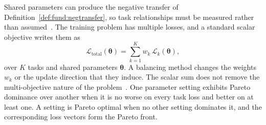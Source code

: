 Shared parameters can produce the negative transfer of
Definition~\ref{def:fund:negtransfer}, so task relationships must be measured rather
than assumed~\cite{standley2020tasks}. The training problem has
multiple losses, and a standard scalar objective writes them as
\begin{equation}\label{eq:fund:mtl-total}
    \mathcal{L}_{\mathrm{total}}(\boldsymbol{\theta})
    = \sum_{k=1}^{K} w_k\,\mathcal{L}_k(\boldsymbol{\theta}),
\end{equation}
over $K$ tasks and shared parameters $\boldsymbol{\theta}$. A balancing method changes
the weights $w_k$ or the update direction that they induce. The scalar sum does not
remove the multi-objective nature of the problem~\cite{sener2018mgda}. One parameter
setting exhibits Pareto dominance over another when it is no worse on every task loss
and better on at least one. A setting is Pareto optimal when no other setting dominates
it, and the corresponding loss vectors form the Pareto front.

